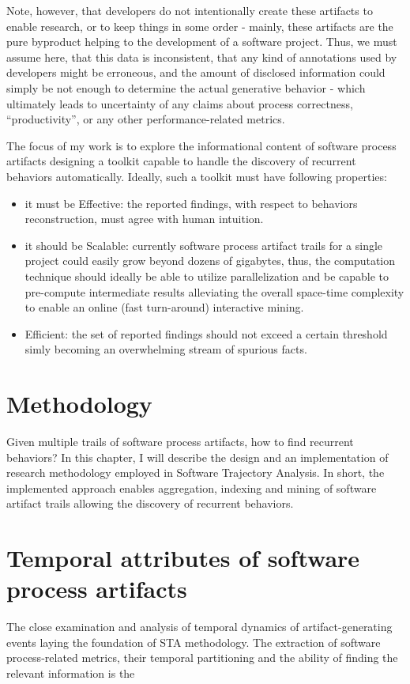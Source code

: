 \documentclass[11pt,oneside]{article}
\numberwithin{equation}{subsection}
\begin{document}
Note, however, that developers do not intentionally create these artifacts to enable research, or to keep 
things in some order - mainly, these artifacts are the pure byproduct helping to the development of a 
software project. Thus, we must assume here, that this data is inconsistent, that any kind of annotations 
used by developers might be erroneous, and the amount of disclosed information could simply be not enough
to determine the actual generative behavior - which ultimately leads to uncertainty of any claims about
process correctness, ``productivity'', or any other performance-related metrics. 

The focus of my work is to explore the informational content of software process artifacts designing 
a toolkit capable to handle the discovery of recurrent behaviors automatically. Ideally, such a toolkit 
must have following properties:
\begin{itemize}
 \item it must be Effective: the reported findings, with respect to behaviors reconstruction, must agree 
 with human intuition.
 \item it should be Scalable: currently software process artifact trails for a single project could easily 
       grow beyond dozens of gigabytes, thus, the computation technique should ideally be able to utilize 
       parallelization and be capable to pre-compute intermediate results alleviating the overall space-time 
       complexity to enable an online (fast turn-around) interactive mining.
 \item Efficient: the set of reported findings should not exceed a certain threshold simly becoming an 
        overwhelming stream of spurious facts.
\end{itemize}


\section{Methodology}
Given multiple trails of software process artifacts, how to find recurrent behaviors? In this chapter, 
I will describe the design and an implementation of research methodology employed in Software Trajectory 
Analysis. In short, the implemented approach enables aggregation, indexing and mining of software 
artifact trails allowing the discovery of recurrent behaviors. 

\section{Temporal attributes of software process artifacts}
The close examination and analysis of temporal dynamics of artifact-generating events laying the foundation 
of STA methodology. The extraction of software process-related metrics, their temporal partitioning and the
ability of finding the relevant information is the 
\end{document}
